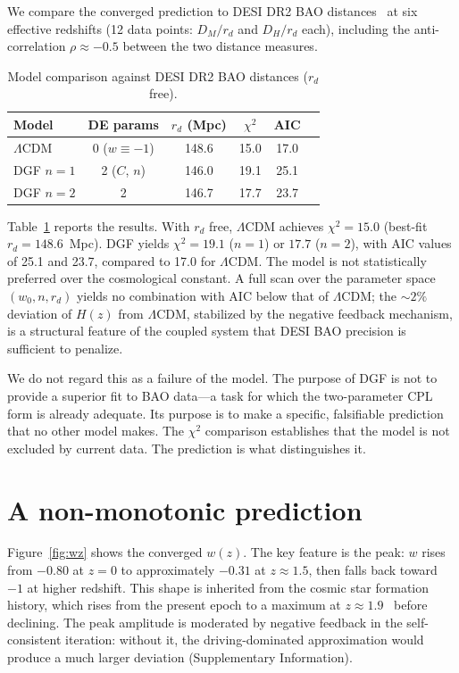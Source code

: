 \documentclass[12pt,a4paper]{article}
\begin{document}
We compare the converged prediction to DESI DR2 BAO distances~\cite{desi2025} at six effective redshifts (12 data points: $D_M/r_d$ and $D_H/r_d$ each), including the anti-correlation $\rho\approx-0.5$ between the two distance measures.

\begin{table}[htbp]
\centering
\caption{Model comparison against DESI DR2 BAO distances ($r_d$ free).}
\label{tab:models}
\begin{tabular}{lccccc}
\toprule
Model & DE params & $r_d$ (Mpc) & $\chi^2$ & AIC & \\
\midrule
$\Lambda$CDM     & 0 ($w\equiv-1$)   & 148.6 & 15.0 & 17.0 \\
DGF $n=1$       & 2 ($C$, $n$)      & 146.0 & 19.1 & 25.1 \\
DGF $n=2$       & 2                  & 146.7 & 17.7 & 23.7 \\
\bottomrule
\end{tabular}
\end{table}

Table~\ref{tab:models} reports the results. With $r_d$ free, $\Lambda$CDM achieves $\chi^2=15.0$ (best-fit $r_d=148.6$~Mpc). DGF yields $\chi^2=19.1$ ($n=1$) or $17.7$ ($n=2$), with AIC values of 25.1 and 23.7, compared to 17.0 for $\Lambda$CDM. The model is not statistically preferred over the cosmological constant. A full scan over the parameter space $(w_0,n,r_d)$ yields no combination with AIC below that of $\Lambda$CDM; the $\sim2\%$ deviation of $H(z)$ from $\Lambda$CDM, stabilized by the negative feedback mechanism, is a structural feature of the coupled system that DESI BAO precision is sufficient to penalize.

We do not regard this as a failure of the model. The purpose of DGF is not to provide a superior fit to BAO data---a task for which the two-parameter CPL form is already adequate. Its purpose is to make a specific, falsifiable prediction that no other model makes. The $\chi^2$ comparison establishes that the model is not excluded by current data. The prediction is what distinguishes it.

\section*{A non-monotonic prediction}

Figure~\ref{fig:wz} shows the converged $w(z)$. The key feature is the peak: $w$ rises from $-0.80$ at $z=0$ to approximately $-0.31$ at $z\approx1.5$, then falls back toward $-1$ at higher redshift. This shape is inherited from the cosmic star formation history, which rises from the present epoch to a maximum at $z\approx1.9$~\cite{madau2014} before declining. The peak amplitude is moderated by negative feedback in the self-consistent iteration: without it, the driving-dominated approximation would produce a much larger deviation (Supplementary Information).
\end{document}
